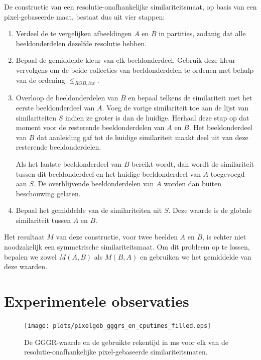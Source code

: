 De constructie van een resolutie-onafhankelijke similariteitsmaat, 
op basis van een pixel-gebaseerde maat, bestaat dus uit vier stappen:
\begin{enumerate}
\item Verdeel de te vergelijken afbeeldingen $A$ en $B$
in partities, zodanig dat alle beeldonderdelen dezelfde resolutie hebben.
\item Bepaal de gemiddelde kleur van elk beeldonderdeel. Gebruik deze kleur vervolgens
om de beide collecties van beeldonderdelen te ordenen met behulp van de ordening $\leq_{RGB,lex}$.
\item Overloop de beeldonderdelen van $B$ en bepaal telkens de similariteit met het eerste 
beeldonderdeel van $A$. Voeg de vorige similariteit toe aan de lijst van similariteiten $S$
indien ze groter is dan de huidige. Herhaal deze stap op dat moment voor de resterende
beeldonderdelen van $A$ en $B$. Het 
beeldonderdeel van $B$ dat aanleiding gaf tot de huidige similariteit maakt deel uit van
deze resterende beeldonderdelen.

Als het laatste beeldonderdeel van $B$ bereikt wordt, dan wordt de similariteit tussen dit
beeldonderdeel en het huidige beeldonderdeel van $A$ toegevoegd aan $S$. De overblijvende
beeldonderdelen van $A$ worden dan buiten beschouwing gelaten. 
\item Bepaal het gemiddelde van de similariteiten uit $S$. Deze waarde is de globale similariteit tussen
$A$ en $B$.
\end{enumerate}

Het resultaat $M$ van deze constructie, voor twee beelden $A$ en $B$, is echter niet noodzakelijk 
een symmetrische similariteitsmaat. Om dit probleem op te lossen, bepalen we zowel $M(A,B)$ als
$M(B,A)$ en gebruiken we het gemiddelde van deze waarden.


\section{Experimentele observaties}

\begin{figure}[tbp]
\begin{center}
\texttt{[image: plots/pixelgeb\_gggrs\_en\_cputimes\_filled.eps]}
\caption{\label{fig:pixelgeb_gggrs_en_cputimes}De GGGR-waarde en de gebruikte rekentijd in ms voor elk van de resolutie-onafhankelijke pixel-gebaseerde similariteitsmaten.}
\end{center}
\end{figure}

